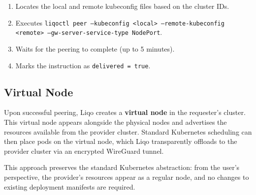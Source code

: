 \begin{enumerate}
    \item Locates the local and remote kubeconfig files based on the cluster IDs.
    \item Executes \texttt{liqoctl peer --kubeconfig <local> --remote-kubeconfig <remote> --gw-server-service-type NodePort}.
    \item Waits for the peering to complete (up to 5 minutes).
    \item Marks the instruction as \texttt{delivered = true}.
\end{enumerate}

\subsection{Virtual Node}

Upon successful peering, Liqo creates a \textbf{virtual node} in the requester's cluster. This virtual node appears alongside the physical nodes and advertises the resources available from the provider cluster. Standard Kubernetes scheduling can then place pods on the virtual node, which Liqo transparently offloads to the provider cluster via an encrypted WireGuard tunnel.

This approach preserves the standard Kubernetes abstraction: from the user's perspective, the provider's resources appear as a regular node, and no changes to existing deployment manifests are required.
